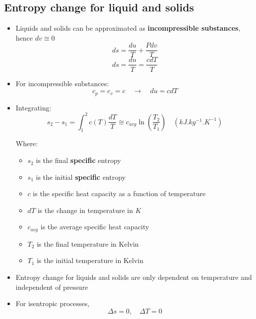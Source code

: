 \documentclass[11pt]{article}
\begin{document}
\subsection{Entropy change for liquid and solids}
\label{sec:orgdf79bfc}
\begin{itemize}
\item Liquids and solids can be approximated as \textbf{incompressible substances}, hence \(dv \cong 0\)
\[ds = \frac{du}{T} + \frac{P dv}{T}\]
\[ds = \frac{du}{T} = \frac{c dT}{T}\]
\item For incompressible substances:
\[c_p = c_v = c \quad \rightarrow \quad du = c dT\]
\item Integrating:
\[s_2 - s_1 = \int_1^2 c(T) \frac{dT}{T} \cong c_{avg} \ln \left(\frac{T_2}{T_1} \right) \quad (\unit{kJ.kg^{-1}.K^{-1}})\]

Where:
\begin{itemize}
\item \(s_2\) is the final \textbf{specific} entropy
\item \(s_1\) is the initial \textbf{specific} entropy
\item \(c\) is the specific heat capacity as a function of temperature
\item \(dT\) is the change in temperature in \(\unit{K}\)
\item \(c_{avg}\) is the average specific heat capacity
\item \(T_2\) is the final temperature in Kelvin
\item \(T_1\) is the initial temperature in Kelvin
\end{itemize}

\item Entropy change for liquids and solids are only dependent on temperature and independent of pressure
\item For isentropic processes,
\[\Delta s = 0, \quad \Delta T = 0\]
\end{itemize}

 \newpage
\end{document}
